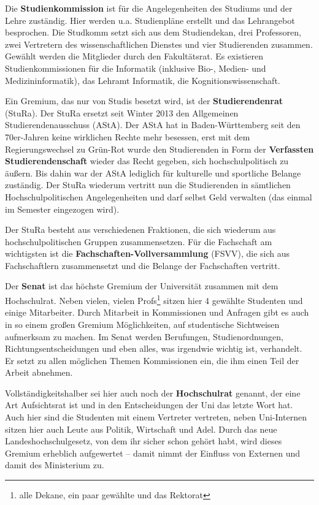 Die \textbf{Studienkommission} ist für die Angelegenheiten des Studiums und der
Lehre zuständig. Hier werden u.a. Studienpläne erstellt und das Lehrangebot
besprochen. Die Studkomm setzt sich aus dem Studiendekan, drei Professoren,
zwei Vertretern des wissenschaftlichen Dienstes und vier Studierenden zusammen.
Gewählt werden die Mitglieder durch den Fakultätsrat. Es existieren Studienkommissionen
f\"ur die Informatik (inklusive Bio-, Medien- und Medizininformatik),
das Lehramt Informatik, die Kognitionswissenschaft.

Ein Gremium, das nur von Studis besetzt wird, ist der \textbf{Studierendenrat} (StuRa).
Der StuRa ersetzt seit Winter 2013 den Allgemeinen Studierendenausschuss (AStA).
Der AStA hat in Baden-W\"urttemberg seit den 70er-Jahren keine wirklichen
Rechte mehr besessen, erst mit dem Regierungswechsel zu Gr\"un-Rot wurde den
Studierenden in Form der \textbf{Verfassten Studierendenschaft} wieder das Recht
gegeben, sich hochschulpolitisch zu äußern. Bis dahin war der AStA
lediglich f\"ur kulturelle und sportliche Belange zust\"andig. Der StuRa wiederum
vertritt nun die Studierenden in s\"amtlichen Hochschulpolitischen Angelegenheiten
und darf selbst Geld verwalten (das einmal im Semester eingezogen wird).

Der StuRa besteht aus verschiedenen Fraktionen, die sich wiederum aus
hochschulpolitischen Gruppen zusammensetzen. F\"ur die Fachschaft am wichtigsten
ist die \textbf{Fachschaften-Vollversammlung} (FSVV), die sich aus Fachschaftlern zusammensetzt und die Belange der Fachschaften vertritt.

Der \textbf{Senat} ist das höchste Gremium der Universität zusammen mit
  dem Hochschulrat.  Neben vielen, vielen Profs\footnote{alle Dekane, ein
  paar gewählte und das Rektorat} sitzen hier 4 gewählte Studenten und
  einige Mitarbeiter.  Durch Mitarbeit in Kommissionen und Anfragen gibt es
  auch in so einem großen Gremium Möglichkeiten, auf studentische Sichtweisen
aufmerksam zu machen.  Im
  Senat werden Berufungen, Studienordnungen, Richtungsentscheidungen und
  eben alles, was irgendwie wichtig ist, verhandelt.  Er setzt zu allen
  möglichen Themen Kommissionen ein, die ihm einen Teil der Arbeit
  abnehmen.


Vollständigkeitshalber sei hier auch noch der \textbf{Hochschulrat}
  genannt, der eine Art Aufsichtsrat ist und in den  Entscheidungen der
  Uni das letzte Wort hat.  Auch hier sind die Studenten mit einem
  Vertreter vertreten, neben Uni-Internen sitzen hier auch Leute aus
  Politik, Wirtschaft und Adel. Durch das neue Landeshochschulgesetz,
von dem ihr sicher schon gehört habt, wird dieses Gremium erheblich
aufgewertet -- damit nimmt der Einfluss von Externen und damit des
Ministerium zu.


